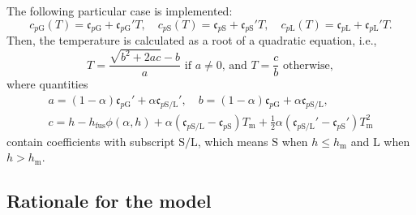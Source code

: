 \documentclass[final]{elsarticle} %
\newcommand{\fusion}[1]{{#1}_\text{fus}}
\newcommand{\Cp}[1]{\mathfrak{c}_{p#1}}
\newcommand{\sol}{\text{S}}
\newcommand{\liq}{\text{L}}
\newcommand{\gas}{\text{G}}
\newcommand{\melt}{\text{m}}
\begin{document}
The following particular case is implemented:
\begin{equation}\label{eq:c_p_special}
    c_{p\gas}(T) = \Cp{\gas} + \Cp{\gas}'T, \quad
    c_{p\sol}(T) = \Cp{\sol} + \Cp{\sol}'T, \quad
    c_{p\liq}(T) = \Cp{\liq} + \Cp{\liq}'T.
\end{equation}
Then, the temperature is calculated as a root of a quadratic equation, i.e.,
\begin{equation}\label{eq:T_special}
    T = \frac{\sqrt{b^2 + 2ac} - b}{a} \text{ if } a\neq0 \text{, and }
    T = \frac{c}{b} \text{ otherwise},
\end{equation}
where quantities
\begin{equation}\label{eq:abc}
    \begin{gathered}
        a = (1-\alpha)\Cp{\gas}' + \alpha\Cp{\sol/\liq}', \quad
        b = (1-\alpha)\Cp{\gas} + \alpha\Cp{\sol/\liq}, \\
        c = h - \fusion{h}\phi(\alpha,h) + \alpha(\Cp{\sol/\liq}-\Cp{\sol})T_\melt
            + \tfrac12\alpha(\Cp{\sol/\liq}'-\Cp{\sol}')T_\melt^2
    \end{gathered}
\end{equation}
contain coefficients with subscript $\sol/\liq$,
which means $\sol$ when $h\leq h_\melt$ and $\liq$ when $h>h_\melt$.

\subsection{Rationale for the model}
\end{document}

